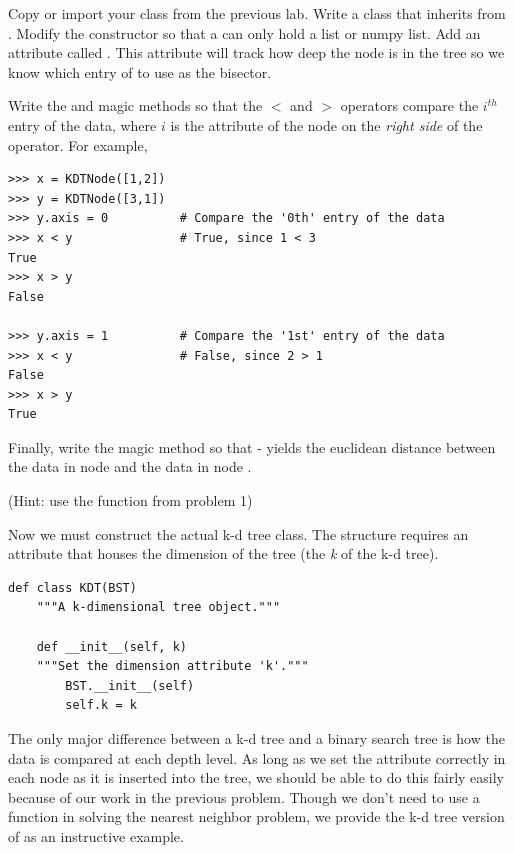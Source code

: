 \begin{problem}
Copy or import your  class from the previous lab.
Write a  class that inherits from .
Modify the constructor so that a  can only hold a list or numpy list.
Add an attribute called .
This attribute will track how deep the node is in the tree so we know which entry of  to use as the bisector.

Write the  and  magic methods so that the $<$ and $>$ operators compare the $i^{th}$ entry of the data, where $i$ is the  attribute of the node on the \emph{right side} of the operator.
For example,

\begin{lstlisting}
>>> x = KDTNode([1,2])
>>> y = KDTNode([3,1])
>>> y.axis = 0			# Compare the '0th' entry of the data 
>>> x < y				# True, since 1 < 3
True
>>> x > y
False

>>> y.axis = 1			# Compare the '1st' entry of the data
>>> x < y				# False, since 2 > 1
False
>>> x > y
True
\end{lstlisting}

Finally, write the  magic method so that  -  yields the euclidean distance between the data in node  and the data in node .

(Hint: use the function from problem 1)
\end{problem}


Now we must construct the actual k-d tree class.
The structure requires an attribute that houses the dimension of the tree (the \emph{k} of the k-d tree).

\begin{lstlisting}
def class KDT(BST)
	"""A k-dimensional tree object."""

	def __init__(self, k)
	"""Set the dimension attribute 'k'."""
		BST.__init__(self)
		self.k = k
\end{lstlisting}


The only major difference between a k-d tree and a binary search tree is how the data is compared at each depth level.
As long as we set the  attribute correctly in each node as it is inserted into the tree, we should be able to do this fairly easily because of our work in the previous problem.
Though we don't need to use a  function in solving the nearest neighbor problem, we provide the k-d tree version of  as an instructive example.

